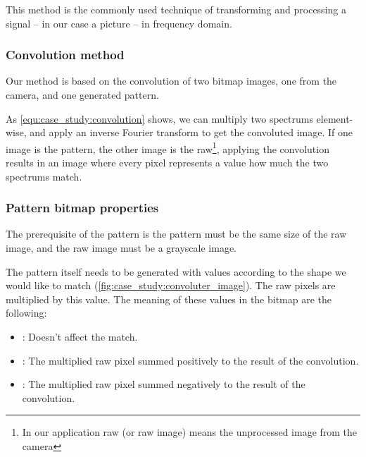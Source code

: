 This method is the commonly used technique of transforming and processing a signal -- in our case a picture -- in frequency domain.

\subsubsection{Convolution method}
\label{sec:case_study:convolution}

Our method is based on the convolution of two bitmap images, one from the camera, and one generated pattern.

As \cref{equ:case_study:convolution} shows, we can multiply two spectrums element-wise, and apply an inverse Fourier transform to get the convoluted image. If one image is the pattern, the other image is the raw\footnote{In our application raw (or raw image) means the unprocessed image from the camera}, applying the convolution results in an image where every pixel represents a value how much the two spectrums match.

\subsubsection{Pattern bitmap properties}

The prerequisite of the pattern is the pattern must be the same size of the raw image, and the raw image must be a grayscale image.

The pattern itself needs to be generated with values according to the shape we would like to match (\cref{fig:case_study:convoluter_image}). The raw pixels are multiplied by this value. The meaning of these values in the bitmap are the following: 
\begin{itemize}
	\item {}: Doesn't affect the match.
	\item {}: The multiplied raw pixel summed positively to the result of the convolution.
	\item {}: The multiplied raw pixel summed negatively to the result of the convolution.
\end{itemize}

